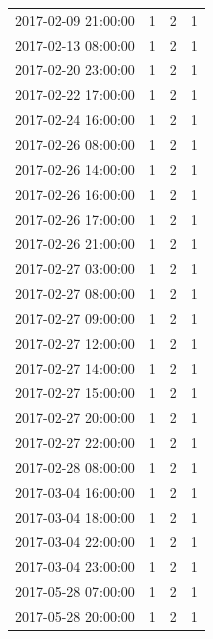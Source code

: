 \begin{tabular}{lrrr}
2017-02-09 21:00:00 & 1 & 2 & 1 \\
2017-02-13 08:00:00 & 1 & 2 & 1 \\
2017-02-20 23:00:00 & 1 & 2 & 1 \\
2017-02-22 17:00:00 & 1 & 2 & 1 \\
2017-02-24 16:00:00 & 1 & 2 & 1 \\
2017-02-26 08:00:00 & 1 & 2 & 1 \\
2017-02-26 14:00:00 & 1 & 2 & 1 \\
2017-02-26 16:00:00 & 1 & 2 & 1 \\
2017-02-26 17:00:00 & 1 & 2 & 1 \\
2017-02-26 21:00:00 & 1 & 2 & 1 \\
2017-02-27 03:00:00 & 1 & 2 & 1 \\
2017-02-27 08:00:00 & 1 & 2 & 1 \\
2017-02-27 09:00:00 & 1 & 2 & 1 \\
2017-02-27 12:00:00 & 1 & 2 & 1 \\
2017-02-27 14:00:00 & 1 & 2 & 1 \\
2017-02-27 15:00:00 & 1 & 2 & 1 \\
2017-02-27 20:00:00 & 1 & 2 & 1 \\
2017-02-27 22:00:00 & 1 & 2 & 1 \\
2017-02-28 08:00:00 & 1 & 2 & 1 \\
2017-03-04 16:00:00 & 1 & 2 & 1 \\
2017-03-04 18:00:00 & 1 & 2 & 1 \\
2017-03-04 22:00:00 & 1 & 2 & 1 \\
2017-03-04 23:00:00 & 1 & 2 & 1 \\
2017-05-28 07:00:00 & 1 & 2 & 1 \\
2017-05-28 20:00:00 & 1 & 2 & 1 \\
\bottomrule
\end{tabular}
